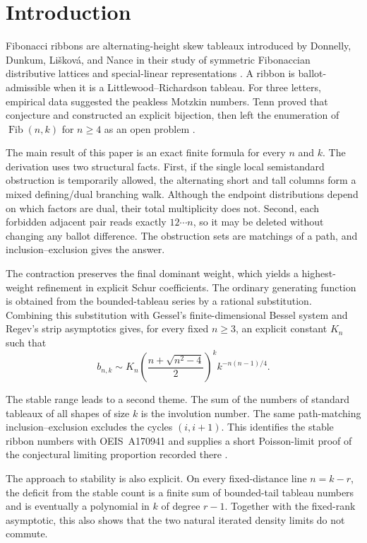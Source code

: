 \documentclass[11pt]{article}
\theoremstyle{definition}
\begin{document}
\section{Introduction}

Fibonacci ribbons are alternating-height skew tableaux introduced by
Donnelly, Dunkum, Li\v{s}kov\'a, and Nance in their study of symmetric
Fibonaccian distributive lattices and special-linear representations
\cite{DonnellyEtAl2023}.  A ribbon is ballot-admissible when it is a
Littlewood--Richardson tableau.  For three letters, empirical data suggested
the peakless Motzkin numbers.  Tenn proved that conjecture and constructed an
explicit bijection, then left the enumeration of
$\operatorname{Fib}(n,k)$ for $n\ge4$ as an open problem
\cite{Tenn2026}.

The main result of this paper is an exact finite formula for every $n$ and
$k$.  The derivation uses two structural facts.  First, if the
single local semistandard obstruction is temporarily allowed, the alternating
short and tall columns form a mixed defining/dual branching walk.  Although
the endpoint distributions depend on which factors are dual, their total
multiplicity does not.  Second, each forbidden adjacent pair reads exactly
$12\cdots n$, so it may be deleted without changing any ballot difference.
The obstruction sets are matchings of a path, and inclusion--exclusion gives
the answer.

The contraction preserves the final dominant weight, which yields a
highest-weight refinement in explicit Schur coefficients.  The ordinary
generating function is obtained from the bounded-tableau series by a rational
substitution.  Combining this substitution with Gessel's finite-dimensional
Bessel system and Regev's strip asymptotics gives, for every fixed $n\ge3$,
an explicit constant $K_n$ such that
\[
 b_{n,k}\sim K_n
 \left(\frac{n+\sqrt{n^2-4}}2\right)^k
 k^{-n(n-1)/4}.
\]

The stable range leads to a second theme.  The sum of the numbers of standard
tableaux of all shapes of size $k$ is the involution number.  The same
path-matching inclusion--exclusion excludes the cycles $(i,i+1)$.  This
identifies the stable ribbon numbers with OEIS~A170941 and supplies a short
Poisson-limit proof of the conjectural limiting proportion recorded there
\cite{OEISA170941}.

The approach to stability is also explicit.  On every fixed-distance line
$n=k-r$, the deficit from the stable count is a finite sum of bounded-tail
tableau numbers and is eventually a polynomial in $k$ of degree $r-1$.
Together with the fixed-rank asymptotic, this also shows that the two natural
iterated density limits do not commute.
\end{document}
